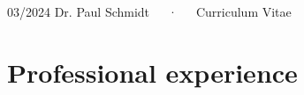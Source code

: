 \documentclass[11pt,a4paper,]{awesome-cv}
\begin{document}
\makecvheader

\makecvfooter
  {03/2024}
    {Dr. Paul Schmidt~~~·~~~Curriculum Vitae}
  {\thepage}






\hypertarget{professional-experience}{%
\section{Professional experience}\label{professional-experience}}
\end{document}
